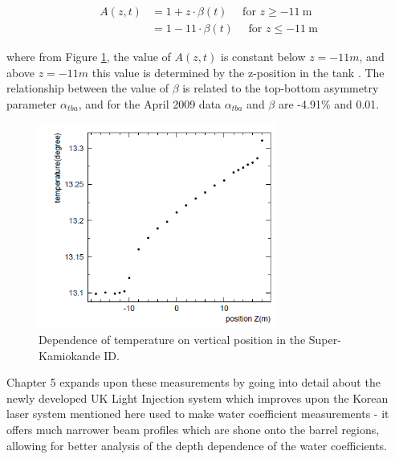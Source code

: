 $$
\begin{aligned}
A(z, t) &=1+z \cdot \beta(t) \quad \text { for } z \geq-11 \mathrm{~m} \label{eq:temp_grad} \\
&=1-11 \cdot \beta(t) \quad \text { for } z \leq-11 \mathrm{~m}
\end{aligned}
$$

where from Figure \ref{fig:temperature_grad}, the value of $A(z,t)$ is constant below $z = -11 m$, and above $z = -11 m$ this value is determined by the z-position in the tank \cite{RENSHAW2015345}. The relationship between the value of $\beta$ is related to the top-bottom asymmetry parameter $\alpha_{tba}$, and for the April 2009 data $\alpha_{tba}$ and $\beta$ are -4.91\% and 0.01. 


\begin{figure}
    \centering
    \includegraphics[width=0.7\textwidth]{Figures/temperature_grad.png}
    \caption{Dependence of temperature on vertical position in the Super-Kamiokande ID.}
    \label{fig:temperature_grad}
\end{figure}

Chapter 5 expands upon these measurements by going into detail about the newly developed UK Light Injection system which improves upon the Korean laser system mentioned here used to make water coefficient measurements - it offers much narrower beam profiles which are shone onto the barrel regions, allowing for better analysis of the depth dependence of the water coefficients. 






